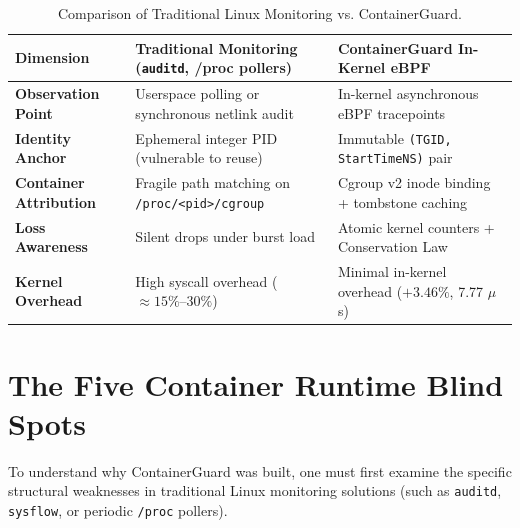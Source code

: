 \documentclass[11pt,a4paper]{article}
\begin{document}
\begin{table}[htbp]
\centering
\small
\begin{tabularx}{\textwidth}{p{3.5cm} X X}
\toprule
\textbf{Dimension} & \textbf{Traditional Monitoring (\texttt{auditd}, /proc pollers)} & \textbf{ContainerGuard In-Kernel eBPF} \\
\midrule
\textbf{Observation Point} & Userspace polling or synchronous netlink audit & In-kernel asynchronous eBPF tracepoints \\
\textbf{Identity Anchor} & Ephemeral integer PID (vulnerable to reuse) & Immutable \texttt{(TGID, StartTimeNS)} pair \\
\textbf{Container Attribution} & Fragile path matching on \texttt{/proc/<pid>/cgroup} & Cgroup v2 inode binding + tombstone caching \\
\textbf{Loss Awareness} & Silent drops under burst load & Atomic kernel counters + Conservation Law \\
\textbf{Kernel Overhead} & High syscall overhead ($\approx 15\%\text{--}30\%$) & Minimal in-kernel overhead ($+3.46\%$, 7.77 $\mu$s) \\
\bottomrule
\end{tabularx}
\caption{Comparison of Traditional Linux Monitoring vs. ContainerGuard.}
\label{tab:comparison}
\end{table}

\newpage


\section{The Five Container Runtime Blind Spots}

To understand why ContainerGuard was built, one must first examine the specific structural weaknesses in traditional Linux monitoring solutions (such as \texttt{auditd}, \texttt{sysflow}, or periodic \texttt{/proc} pollers).
\end{document}

